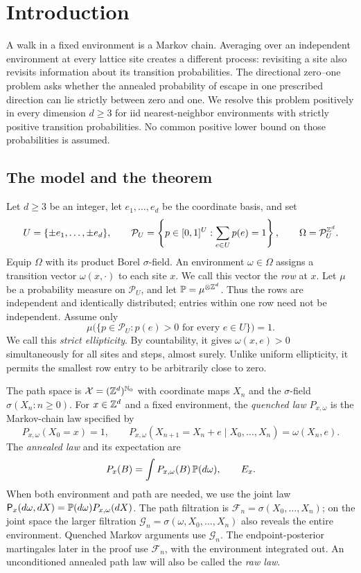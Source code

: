 \section{Introduction}\label{sec:introduction}

A walk in a fixed environment is a Markov chain. Averaging over an
independent environment at every lattice site creates a different
process: revisiting a site also revisits information about its transition
probabilities. The directional zero--one problem asks whether the
annealed probability of escape in one prescribed direction can lie
strictly between zero and one. We resolve this problem positively in
every dimension $d\ge3$ for iid nearest-neighbor environments with
strictly positive transition probabilities. No common positive lower
bound on those probabilities is assumed.

\subsection{The model and the theorem}

Let $d\ge3$ be an integer, let $e_1,\ldots,e_d$ be the coordinate basis,
and set
\[
 U=\{\pm e_1,\ldots,\pm e_d\},\qquad
 \mathcal P_U=\left\{p\in[0,1]^U:\sum_{e\in U}p(e)=1\right\},
 \qquad \Omega=\mathcal P_U^{\mathbb Z^d}.
\]
Equip $\Omega$ with its product Borel $\sigma$-field.
An environment $\omega\in\Omega$ assigns a transition vector
$\omega(x,\cdot)$ to each site $x$. We call this vector the \emph{row}
at $x$. Let $\mu$ be a probability measure on $\mathcal P_U$, and let
$\mathbb P=\mu^{\otimes\mathbb Z^d}$. Thus the rows are independent and identically
distributed; entries within one row need not be independent. Assume only
\begin{equation}\label{eq:ellipticity}
 \mu\bigl(\{p\in\mathcal P_U:p(e)>0\text{ for every }e\in U\}\bigr)=1.
\end{equation}
We call this \emph{strict ellipticity}. By countability, it gives
$\omega(x,e)>0$ simultaneously for all sites and steps, almost surely.
Unlike uniform ellipticity, it permits the smallest row entry to be
arbitrarily close to zero.

The path space is $\mathcal X=(\mathbb Z^d)^{\mathbb N_0}$ with coordinate
maps $X_n$ and the $\sigma$-field $\sigma(X_n:n\ge0)$. For $x\in\mathbb Z^d$ and a fixed environment, the
\emph{quenched law} $P_{x,\omega}$ is the Markov-chain law specified by
\[
 P_{x,\omega}(X_0=x)=1,\qquad
 P_{x,\omega}(X_{n+1}=X_n+e\mid X_0,\ldots,X_n)=\omega(X_n,e).
\]
The \emph{annealed law} and its expectation are
\[
 P_x(B)=\int P_{x,\omega}(B)\,\mathbb P(d\omega),\qquad E_x.
\]
When both environment and path are needed, we use the joint law
$\mathsf P_x(d\omega,dX)=\mathbb P(d\omega)P_{x,\omega}(dX)$.
The path filtration is $\mathcal F_n=\sigma(X_0,\ldots,X_n)$;
on the joint space the larger filtration
$\mathcal G_n=\sigma(\omega,X_0,\ldots,X_n)$ also reveals the entire
environment. Quenched Markov arguments use $\mathcal G_n$.
The endpoint-posterior martingales later in the proof use
$\mathcal F_n$, with the environment integrated out.
An unconditioned annealed path law will also be called the \emph{raw law}.


